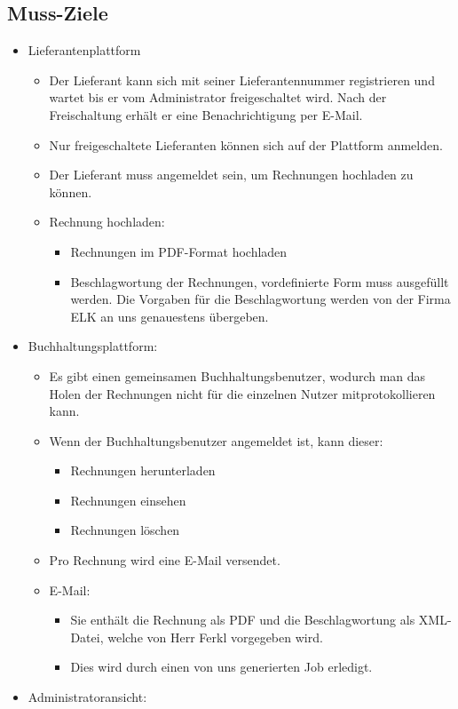 \subsection{Muss-Ziele}
\begin{itemize}
\item Lieferantenplattform 

\begin{itemize}
\item Der Lieferant kann sich mit seiner Lieferantennummer registrieren
und wartet bis er vom Administrator freigeschaltet wird. Nach der
Freischaltung erhält er eine Benachrichtigung per E-Mail. 
\item Nur freigeschaltete Lieferanten können sich auf der Plattform anmelden. 
\item Der Lieferant muss angemeldet sein, um Rechnungen hochladen zu können. 
\item Rechnung hochladen: 

\begin{itemize}
\item Rechnungen im PDF-Format hochladen 
\item Beschlagwortung der Rechnungen, vordefinierte Form muss ausgefüllt
werden. Die Vorgaben für die Beschlagwortung werden von der Firma
ELK an uns genauestens übergeben. 
\end{itemize}
\end{itemize}
\item Buchhaltungsplattform: 

\begin{itemize}
\item Es gibt einen gemeinsamen Buchhaltungsbenutzer, wodurch man das Holen
der Rechnungen nicht für die einzelnen Nutzer mitprotokollieren kann. 
\item Wenn der Buchhaltungsbenutzer angemeldet ist, kann dieser: 

\begin{itemize}
\item Rechnungen herunterladen 
\item Rechnungen einsehen 
\item Rechnungen löschen 
\end{itemize}
\item Pro Rechnung wird eine E-Mail versendet. 
\item E-Mail: 

\begin{itemize}
\item Sie enthält die Rechnung als PDF und die Beschlagwortung als XML-Datei,
welche von Herr Ferkl vorgegeben wird. 
\item Dies wird durch einen von uns generierten Job erledigt. 
\end{itemize}
\end{itemize}
\item Administratoransicht: 


\end{itemize}
